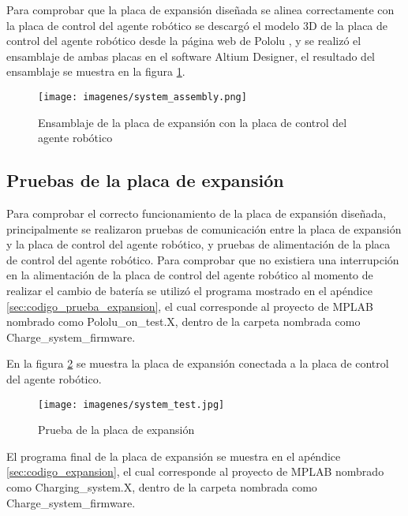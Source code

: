 Para comprobar que la placa de expansión diseñada se alinea correctamente
con la placa de control del agente robótico se descargó el modelo
3D de la placa de control del agente robótico desde la página web de Pololu
\cite{noauthor_pololu_nodate}, y se realizó el ensamblaje de ambas placas
en el software Altium Designer, el resultado del ensamblaje se muestra en
la figura \ref{fig:expansion_board_assembly}.

\begin{figure}[H]
    \centering
    \texttt{[image: imagenes/system\_assembly.png]}
    \caption{Ensamblaje de la placa de expansión con la placa de control del agente robótico}
    \label{fig:expansion_board_assembly}
\end{figure}

\subsection{Pruebas de la placa de expansión}

Para comprobar el correcto funcionamiento de la placa de expansión diseñada,
principalmente se realizaron pruebas de comunicación entre la placa de expansión
y la placa de control del agente robótico, y pruebas de alimentación de la placa
de control del agente robótico. Para comprobar que no existiera una interrupción
en la alimentación de la placa de control del agente robótico al momento de 
realizar el cambio de batería se utilizó el programa mostrado en el apéndice
\ref{sec:codigo_prueba_expansion}, el cual corresponde al proyecto de MPLAB
nombrado como Pololu\_on\_test.X, dentro de la carpeta nombrada como Charge\_system\_firmware.

En la figura \ref{fig:expansion_board_test} se muestra la placa de expansión
conectada a la placa de control del agente robótico.

\begin{figure}[H]
    \centering
    \texttt{[image: imagenes/system\_test.jpg]}
    \caption{Prueba de la placa de expansión}
    \label{fig:expansion_board_test}
\end{figure}

El programa final de la placa de expansión se muestra en el apéndice \ref{sec:codigo_expansion},
el cual corresponde al proyecto de MPLAB nombrado como Charging\_system.X, dentro de la carpeta
nombrada como Charge\_system\_firmware.
